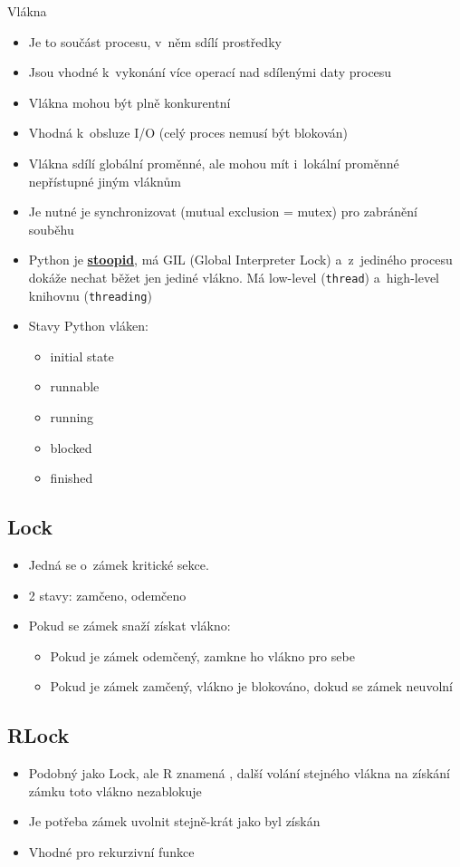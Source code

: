 Vlákna
\begin{itemize}
    \item Je to součást procesu, v~něm sdílí prostředky
    \item Jsou vhodné k~vykonání více operací nad sdílenými daty procesu
    \item Vlákna mohou být plně konkurentní
    \item Vhodná k~obsluze I/O (celý proces nemusí být blokován)
    \item Vlákna sdílí globální proměnné, ale mohou mít i~lokální proměnné nepřístupné jiným vláknům
    \item Je nutné je synchronizovat (mutual exclusion = mutex) pro zabránění souběhu
    \item Python je \underline{\textbf{stoopid}}, má GIL (Global Interpreter Lock) a~z~jediného procesu dokáže nechat běžet jen jediné vlákno. Má low-level (\texttt{thread}) a~high-level knihovnu (\texttt{threading})
    \item Stavy Python vláken:
    \begin{itemize}
        \item initial state
        \item runnable
        \item running
        \item blocked
        \item finished
    \end{itemize}
\end{itemize}

\subsection{Lock}
\begin{itemize}
    \item Jedná se o~zámek kritické sekce. 
    \item 2 stavy: zamčeno, odemčeno
    \item Pokud se zámek snaží získat vlákno:
    \begin{itemize}
        \item Pokud je zámek odemčený, zamkne ho vlákno pro sebe
        \item Pokud je zámek zamčený, vlákno je blokováno, dokud se zámek neuvolní
    \end{itemize}
\end{itemize}

\subsection{RLock}
\begin{itemize}
    \item Podobný jako Lock, ale R znamená , další volání stejného vlákna na získání zámku toto vlákno nezablokuje
    \item Je potřeba zámek uvolnit stejně-krát jako byl získán
    \item Vhodné pro rekurzivní funkce
\end{itemize}

